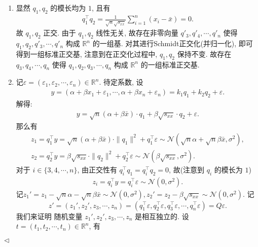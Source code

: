 \documentclass[11pt]{article}
\newenvironment{answer}[1][Solution]{\begin{trivlist}
    \item[\hskip \labelsep {\bfseries #1.}\hskip \labelsep]}{\hfill$\lhd$\end{trivlist}}
\newcommand\1{\mathds{1}}
\newcommand\R{\mathbb{R}}
\newcommand\NN{\mathcal{N}}
\begin{document}
\begin{answer}
    \begin{enumerate}[label = (\arabic*)]
        \item 显然 $q_1, q_2$ 的模长均为 $1$, 且有
        \begin{align*}
            q_1^{\top} q_2 = \frac{1}{\sqrt{n}\sqrt{s_{xx}}}\sum_{i=1}^{n} (x_i - \bar{x}) = 0.
        \end{align*}
        故 $q_1, q_2$ 正交. 由于 $q_1, q_2$ 线性无关, 故存在非零向量 $q'_3, q'_4, \cdots, q'_n$ 使得 $q_1, q_2, q'_3, \cdots, q'_n$ 构成 $\R^n$ 的一组基. 对其进行Schmidt正交化(并归一化), 即可得到一组标准正交基, 注意到在正交化过程中, $q_1, q_2$ 保持不变. 故存在 $q_3, q_4, \cdots, q_n$ 使得 $q_1, q_2, q_3, \cdots, q_n$ 构成 $\R^n$ 的一组标准正交基.
        \item 记$\varepsilon = (\varepsilon_1, \varepsilon_2, \cdots, \varepsilon_n) \in \R^n$. 待定系数, 设
        \begin{align*}
            y = (\alpha+\beta x_1 + \varepsilon_1, \cdots, \alpha+\beta x_n + \varepsilon_n) = k_1 q_1 + k_2 q_2 + \varepsilon.
        \end{align*}
        解得:
        \begin{align*}
            y = \sqrt{n}(\alpha + \beta\bar{x})\cdot q_1 + \beta \sqrt{s_{xx}}\cdot q_2 + \varepsilon.
        \end{align*}
        那么有
        \begin{gather*}
            z_1 = q_1^{\top} y = \sqrt{n}(\alpha + \beta \bar{x})\cdot \|q_1\|^2 + q_1^\top \varepsilon \sim \NN(\sqrt{n}\alpha+\sqrt{n}\beta\bar{x}, \sigma^2), \\
            z_2 = q_2^\top y = \beta\sqrt{s_{xx}} \cdot \|q_2\|^2 + q_2^{\top}\varepsilon  \sim \NN(\beta\sqrt{s_{xx}}, \sigma^2).
        \end{gather*}
        对于 $i\in \{3, 4, \cdots, n\}$, 由正交性有 $q_i^\top q_1 = q_i^\top q_2 = 0$, 故(注意到 $q_i$ 的模长为 $1$)
        \begin{align*}
            z_i = q_i^{\top} y = q_i^{\top}\varepsilon \sim \NN(0, \sigma^2).
        \end{align*}
        记$z_1' = z_1 - \sqrt{n}\alpha-\sqrt{n}\beta \bar{x} \sim \NN(0, \sigma^2), z_2' = z_2 - \beta\sqrt{s_{xx}} \sim \NN(0, \sigma^2)$.
        记
        \[
        z' = (z_1',z_2',z_3, \cdots, z_n) = (q_1^{\top} \varepsilon, q_2^{\top} \varepsilon, q_3^{\top} \varepsilon, \cdots, q_n^{\top} \varepsilon) = Q\varepsilon.
        \] 我们来证明 随机变量 $z_1', z_2', z_3, \cdots, z_n$ 是相互独立的. 设 $t = (t_1, t_2, \cdots, t_n) \in \R^n$, 有

\end{enumerate}
\end{answer}
\end{document}
